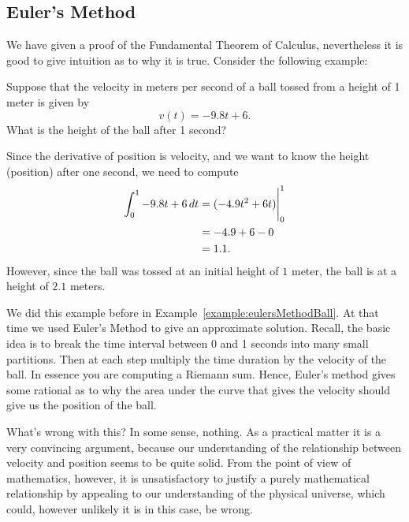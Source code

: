 \subsection*{Euler's Method}

We have given a proof of the Fundamental Theorem of Calculus,
nevertheless it is good to give intuition as to why it is
true. Consider the following example:

\begin{example}
Suppose that the velocity in meters per second of a ball tossed from a
height of 1 meter is given by
\[
v(t) = -9.8t + 6.
\]
What is the height of the ball after 1 second?
\end{example}

\begin{solution}
Since the derivative of position is velocity, and we want to know the
height (position) after one second, we need to compute
\begin{align*}
\int_0^1 -9.8t + 6 \, d t &= (-4.9t^2 + 6t)\Bigg|_0^1\\
&= -4.9 + 6 - 0\\
&= 1.1.
\end{align*}
However, since the ball was tossed at an initial height of $1$ meter,
the ball is at a height of $2.1$ meters.
\end{solution}

We did this example before in
Example~\ref{example:eulersMethodBall}. At that time we used Euler's
Method to give an approximate solution. Recall, the basic idea is to
break the time interval between 0 and 1 seconds into many small
partitions. Then at each step multiply the time duration by the
velocity of the ball. In essence you are computing a Riemann
sum. Hence, Euler's method gives some rational as to why the area
under the curve that gives the velocity should give us the position of
the ball.

What's wrong with this? In some sense, nothing. As a practical matter
it is a very convincing argument, because our understanding of the
relationship between velocity and position seems to be quite
solid. From the point of view of mathematics, however, it is
unsatisfactory to justify a purely mathematical relationship by
appealing to our understanding of the physical universe, which could,
however unlikely it is in this case, be wrong.














